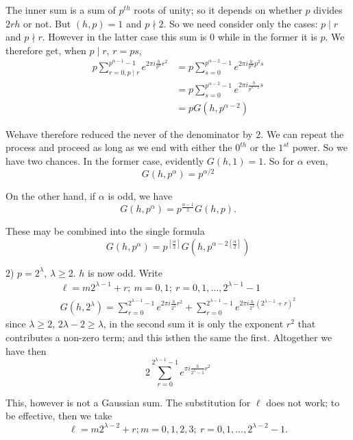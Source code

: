 The inner sum is a sum of $p^{th}$ roots of unity; so it depends on
whether $p$ divides $2 rh$ or not. But $(h, p)=1$ and $p \nmid 2$. So we
need consider only the cases: $p\mid r$ and $p\nmid r$. However in the latter
case this sum is $0$ while in the former it is $p$. We therefore get,
when $p\mid r$, $r= ps$,
\begin{align*}
  p \sum^{p^{\alpha-1}-1}_{r=0, p\mid r} e^{2 \pi i
    \frac{h}{p^\alpha} r^2} & = p\sum^{p^{\alpha-2}-1}_{s=0}
    e^{2 \pi i \frac{h}{p^\alpha} p^2 s}\\
    & = p \sum^{p^{\alpha-2}-1}_{s=0} e^{2 \pi i
      \frac{h}{p^{\alpha-2}}s}\\
    & = p G(h, p^{\alpha-2})
\end{align*}

We\pageoriginale have therefore reduced the never of the denominator
by 2. We can 
repeat the process and proceed as long as we end with either the
$0^{th}$ or the $1^{st}$ power. So we have two chances. In the former
case, evidently $G(h, 1)=1$. So for $\alpha$ even, 
$$
G(h, p^\alpha) = p^{\alpha/2}
$$ 

On the other hand, if $\alpha$ is odd, we have
$$
G(h, p^\alpha) = p^{\frac{\alpha-1}{2}} G(h, p).
$$

These may be combined into the single formula
\begin{equation*}
  G(h, p^\alpha)= p^{[\frac{\alpha}{2}]} G \left(h,
  p^{\alpha-2[\frac{\alpha}{2}]}\right) \tag{1}\label{part4:lec35:eq1}
\end{equation*}

2) $p= 2^\lambda$, $\lambda \geq 2$. $h$ is now odd. Write 
\begin{gather*}
  \ell = m 2^{\lambda-1} + r; ~m =0 , 1; ~ r=0, 1, \ldots,
  2^{\lambda-1}-1\\
  G(h, 2^\lambda) = \sum^{2^{\lambda-1}-1}_{r=0} e^{2 \pi i
    \frac{h}{2^\lambda} r^2} + \sum^{2^{\lambda-1}-1}_{r=0}
  e^{2 \pi i \frac{h}{2^\lambda} (2^{\lambda-1}+r)^2}
\end{gather*}
since $\lambda \geq 2$, $2 \lambda -2 \geq \lambda$, in the second sum
it is only the exponent $r^2$ that contributes a non-zero term; and
this is\pageoriginale then the same the first. Altogether we have
then
\begin{equation*}
  2 \sum^{2^{\lambda-1}-1}_{r=0} e^{\pi i
    \frac{h}{2^\lambda-1} r^2} \tag{*}\label{part4:lec35:eq*}
\end{equation*}

This, however is not a Gaussian sum. The substitution for $\ell$ does
not work; to be effective, then we take
$$
\ell = m 2^{\lambda-2} + r; m=0, 1, 2, 3; ~r=0, 1,\ldots, 2^{\lambda-2}-1. 
$$

